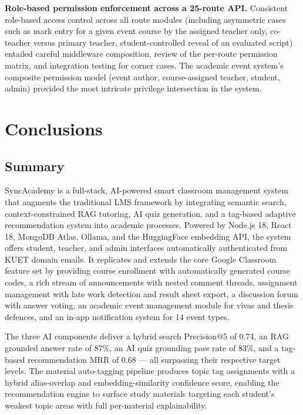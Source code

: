 \documentclass[12pt,a4paper]{report}
\begin{document}
\textbf{Role-based permission enforcement across a 25-route API.} Consistent role-based access control across all route modules (including asymmetric cases such as mark entry for a given event course by the assigned teacher only, co-teacher versus primary teacher, student-controlled reveal of an evaluated script) entailed careful middleware composition, review of the per-route permission matrix, and integration testing for corner cases. The academic event system's composite permission model (event author, course-assigned teacher, student, admin) provided the most intricate privilege intersection in the system.

\chapter{Conclusions}

\section{Summary}

SyncAcademy is a full-stack, AI-powered smart classroom management system that augments the traditional LMS framework by integrating semantic search, context-constrained RAG tutoring, AI quiz generation, and a tag-based adaptive recommendation system into academic processes. Powered by Node.js 18, React 18, MongoDB Atlas, Ollama, and the HuggingFace embedding API, the system offers student, teacher, and admin interfaces automatically authenticated from KUET domain emails. It replicates and extends the core Google Classroom feature set by providing course enrollment with automatically generated course codes, a rich stream of announcements with nested comment threads, assignment management with late work detection and result sheet export, a discussion forum with answer voting, an academic event management module for vivas and thesis defences, and an in-app notification system for 14 event types.

The three AI components deliver a hybrid search Precision@5 of 0.74, an RAG grounded answer rate of 87\%, an AI quiz grounding pass rate of 83\%, and a tag-based recommendation MRR of 0.68 --- all surpassing their respective target levels. The material auto-tagging pipeline produces topic tag assignments with a hybrid alias-overlap and embedding-similarity confidence score, enabling the recommendation engine to surface study materials targeting each student's weakest topic areas with full per-material explainability.
\end{document}
